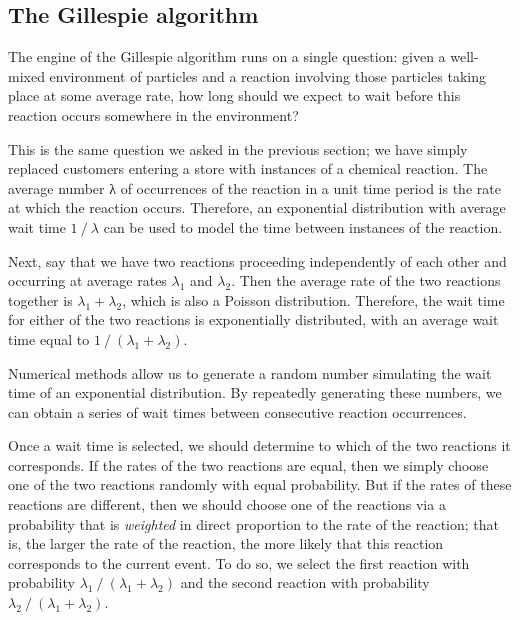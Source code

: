 \begin{qbox}\end{qbox}


\FloatBarrier
{}
\subsection{The Gillespie algorithm}

The engine of the Gillespie algorithm runs on a single question: given a well-mixed environment of particles and a reaction involving those particles taking place at some average rate, how long should we expect to wait before this reaction occurs somewhere in the environment?

This is the same question we asked in the previous section; we have simply replaced customers entering a store with instances of a chemical reaction. The average number λ of occurrences of the reaction in a unit time period is the rate at which the reaction occurs. Therefore, an exponential distribution with average wait time $1\mathbin{/}\lambda$ can be used to model the time between instances of the reaction.

Next, say that we have two reactions proceeding independently of each other and occurring at average rates $\lambda_1$ and $\lambda_2$. Then the average rate of the two reactions together is $\lambda_1 + \lambda_2$, which is also a Poisson distribution. Therefore, the wait time for either of the two reactions is exponentially distributed, with an average wait time equal to $1\mathbin{/}(\lambda_1 + \lambda_2)$.

Numerical methods allow us to generate a random number simulating the wait time of an exponential distribution. By repeatedly generating these numbers, we can obtain a series of wait times between consecutive reaction occurrences.

Once a wait time is selected, we should determine to which of the two reactions it corresponds. If the rates of the two reactions are equal, then we simply choose one of the two reactions randomly with equal probability. But if the rates of these reactions are different, then we should choose one of the reactions via a probability that is \textit{weighted} in direct proportion to the rate of the reaction; that is, the larger the rate of the reaction, the more likely that this reaction corresponds to the current event.\citep{Schwartz_2008} To do so, we select the first reaction with probability $\lambda_1\mathbin{/}(\lambda_1 + \lambda_2)$ and the second reaction with probability $\lambda_2\mathbin{/}(\lambda_1 + \lambda_2)$.


